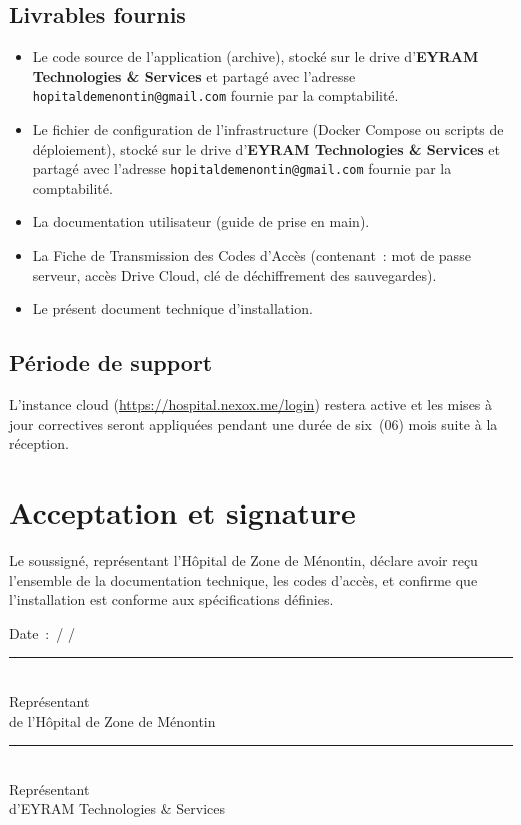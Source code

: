 \documentclass[11pt,a4paper]{article}
\newcommand{\champvide}[1]{\underline{\hspace{#1}}}
\begin{document}
\subsection{Livrables fournis}
\begin{itemize}
  \item Le code source de l'application (archive), stocké sur le drive d'\textbf{EYRAM Technologies \& Services} et partagé avec l'adresse \nolinkurl{hopitaldemenontin@gmail.com} fournie par la comptabilité.
  \item Le fichier de configuration de l'infrastructure (Docker Compose ou scripts de déploiement), stocké sur le drive d'\textbf{EYRAM Technologies \& Services} et partagé avec l'adresse \nolinkurl{hopitaldemenontin@gmail.com} fournie par la comptabilité.
  \item La documentation utilisateur (guide de prise en main).
  \item La Fiche de Transmission des Codes d'Accès (contenant~: mot de passe serveur, accès Drive Cloud, clé de déchiffrement des sauvegardes).
  \item Le présent document technique d'installation.
\end{itemize}

\subsection{Période de support}
L'instance cloud (\url{https://hospital.nexox.me/login}) restera active et les mises à jour correctives seront appliquées pendant une durée de six~(06) mois suite à la réception.

\newpage
\section{Acceptation et signature}

Le soussigné, représentant l'Hôpital de Zone de Ménontin, déclare avoir reçu l'ensemble de la documentation technique, les codes d'accès, et confirme que l'installation est conforme aux spécifications définies.

\vspace{0.6cm}
\noindent Date~: \champvide{1.6cm}\,/\,\champvide{1.6cm}\,/\,\champvide{2.4cm}

\vspace{4.2cm}
\noindent
\begin{minipage}[t]{0.46\textwidth}
\centering
\rule{0.9\linewidth}{0.4pt}\\[0.3em]
{\small Représentant\\ de l'Hôpital de Zone de Ménontin}
\end{minipage}%
\hfill
\begin{minipage}[t]{0.46\textwidth}
\centering
\rule{0.9\linewidth}{0.4pt}\\[0.3em]
{\small Représentant\\ d'EYRAM Technologies \& Services}
\end{minipage}
\end{document}
